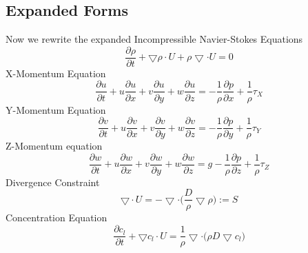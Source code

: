\documentclass{article}
\numberwithin{equation}{subsection}
\begin{document}
\subsection{Expanded Forms}
Now we rewrite the expanded Incompressible Navier-Stokes Equations
\begin{equation}
    \frac{\partial \rho}{\partial t} + \bigtriangledown \rho \cdot U + \rho \bigtriangledown \cdot U = 0
\end{equation}
X-Momentum Equation
\begin{equation}
    \frac{\partial u}{\partial t} + u \frac{\partial u}{\partial x} + v \frac{\partial u}{\partial y} + w \frac{\partial u}{\partial z} = - \frac{1}{\rho}\frac{\partial p}{\partial x} + \frac{1}{\rho}\tau_X
\end{equation}
Y-Momentum Equation
\begin{equation}
    \frac{\partial v}{\partial t} + u \frac{\partial v}{\partial x} + v \frac{\partial v}{\partial y} + w \frac{\partial v}{\partial z} = - \frac{1}{\rho}\frac{\partial p}{\partial y} + \frac{1}{\rho}\tau_Y
\end{equation}
Z-Momentum equation
\begin{equation}
    \frac{\partial w}{\partial t} + u \frac{\partial w}{\partial x} + v \frac{\partial w}{\partial y} + w \frac{\partial w}{\partial z} = g - \frac{1}{\rho}\frac{\partial p}{\partial z} + \frac{1}{\rho}\tau_Z
\end{equation}
Divergence Constraint
\begin{equation}
    \bigtriangledown \cdot U = - \bigtriangledown \cdot \Bigg(\frac{D}{\rho} \bigtriangledown \rho\Bigg) := S
\end{equation}
Concentration Equation
\begin{equation}
\frac{\partial c_l}{\partial t} + \bigtriangledown c_l \cdot U = \frac{1}{\rho} \bigtriangledown \cdot \Big( \rho D \bigtriangledown c_l\Big)
\end{equation}



\end{document}
